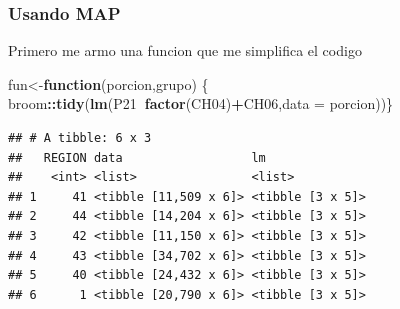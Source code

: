 \documentclass[]{book}
\newenvironment{Shaded}{\begin{snugshade}}{\end{snugshade}}
\newcommand{\ControlFlowTok}[1]{\textcolor[rgb]{0.13,0.29,0.53}{\textbf{#1}}}
\newcommand{\DataTypeTok}[1]{\textcolor[rgb]{0.13,0.29,0.53}{#1}}
\newcommand{\KeywordTok}[1]{\textcolor[rgb]{0.13,0.29,0.53}{\textbf{#1}}}
\newcommand{\NormalTok}[1]{#1}
\newcommand{\OperatorTok}[1]{\textcolor[rgb]{0.81,0.36,0.00}{\textbf{#1}}}
\newcommand{\StringTok}[1]{\textcolor[rgb]{0.31,0.60,0.02}{#1}}
\begin{document}
\hypertarget{usando-map}{%
\subsubsection{Usando MAP}\label{usando-map}}

Primero me armo una funcion que me simplifica el codigo

\begin{Shaded}
\begin{Highlighting}[]
\NormalTok{fun<-}\ControlFlowTok{function}\NormalTok{(porcion,grupo) \{  broom}\OperatorTok{::}\KeywordTok{tidy}\NormalTok{(}\KeywordTok{lm}\NormalTok{(P21}\OperatorTok{~}\KeywordTok{factor}\NormalTok{(CH04)}\OperatorTok{+}\NormalTok{CH06,}\DataTypeTok{data =}\NormalTok{ porcion))\}}
\end{Highlighting}
\end{Shaded}

\begin{Shaded}
\end{Shaded}

\begin{verbatim}
## # A tibble: 6 x 3
##   REGION data                  lm              
##    <int> <list>                <list>          
## 1     41 <tibble [11,509 x 6]> <tibble [3 x 5]>
## 2     44 <tibble [14,204 x 6]> <tibble [3 x 5]>
## 3     42 <tibble [11,150 x 6]> <tibble [3 x 5]>
## 4     43 <tibble [34,702 x 6]> <tibble [3 x 5]>
## 5     40 <tibble [24,432 x 6]> <tibble [3 x 5]>
## 6      1 <tibble [20,790 x 6]> <tibble [3 x 5]>
\end{verbatim}

\begin{Shaded}
\end{Shaded}
\end{document}
